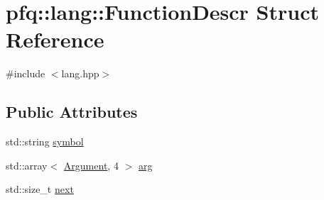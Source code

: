 \hypertarget{structpfq_1_1lang_1_1FunctionDescr}{\section{pfq\+:\+:lang\+:\+:Function\+Descr Struct Reference}
\label{structpfq_1_1lang_1_1FunctionDescr}
}


{\ttfamily \#include $<$lang.\+hpp$>$}

\subsection*{Public Attributes}
\begin{DoxyCompactItemize}
\item 
std\+::string \hyperlink{structpfq_1_1lang_1_1FunctionDescr_a21f51c65f55dddd54de1171d8914c030}{symbol}
\item 
std\+::array$<$ \hyperlink{structpfq_1_1lang_1_1Argument}{Argument}, 4 $>$ \hyperlink{structpfq_1_1lang_1_1FunctionDescr_a2be2814d79d9836cd8e4adbc4dc4e1ca}{arg}
\item 
std\+::size\+\_\+t \hyperlink{structpfq_1_1lang_1_1FunctionDescr_aed683dff23bcead8e4a16ac21ef8ae68}{next}
\end{DoxyCompactItemize}


